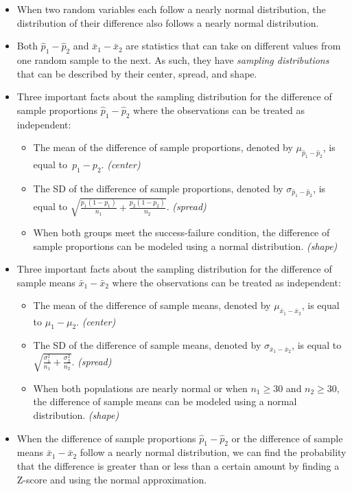\begin{itemize}
\item When two random variables each follow a nearly normal distribution, the distribution of their difference also follows a nearly normal distribution.

\item
  Both $\hat{p}_1-\hat{p}_2$ and $\bar{x}_1-\bar{x}_2$ are
  statistics that can take on different values from one random
  sample to the next.
  As such, they have \emph{sampling distributions} that can be
  described by their center, spread, and shape.

\item Three important facts about the sampling distribution for the difference of sample proportions $\hat{p}_1-\hat{p}_2$ where the observations can be treated as independent:
\begin{itemize}\vspace{-1mm}
  \setlength{\itemsep}{0mm}
  \item The mean of the difference of sample proportions, denoted by $\mu_{\hat{p}_1-\hat{p}_2}$, is equal to~$p_1-p_2$. \textit{(center)}
  \item The SD of the difference of sample proportions, denoted by $\sigma_{\hat{p}_1-\hat{p}_2}$, is equal to $\sqrt{\frac{p_1(1-p_1)}{n_1} + \frac{p_2(1-p_2)}{n_2}}$. \textit{(spread)}
  \item When both groups meet the success-failure condition, the difference of sample proportions can be modeled using a normal distribution. \textit{(shape)}
\end{itemize}


\item Three important facts about the sampling distribution for the difference of sample means $\bar{x}_1-\bar{x}_2$ where the observations can be treated as independent:
\begin{itemize}\vspace{-1mm}
  \setlength{\itemsep}{0mm}
  \item The mean of the difference of sample means, denoted by $\mu_{\bar{x}_1-\bar{x}_2}$, is equal to $\mu_1-\mu_2$. \textit{(center)}
  \item The SD of the difference of sample means, denoted by $\sigma_{\bar{x}_1-\bar{x}_2}$, is equal to $ \sqrt{\frac{\sigma_1^2}{n_1} + \frac{\sigma_2^2}{n_2}}$. \textit{(spread)}
  \item When both populations are nearly normal or when $n_1\ge 30$ and $n_2\ge 30$, the difference of sample means can be modeled using a normal distribution. \textit{(shape)}
\end{itemize}

\item When the difference of sample proportions $\hat{p}_1-\hat{p}_2 $ or the difference of sample means $\bar{x}_1-\bar{x}_2$ follow a nearly normal distribution, we can find the probability that the difference is greater than or less than a certain amount by finding a Z-score and using the normal approximation.  

\end{itemize}

